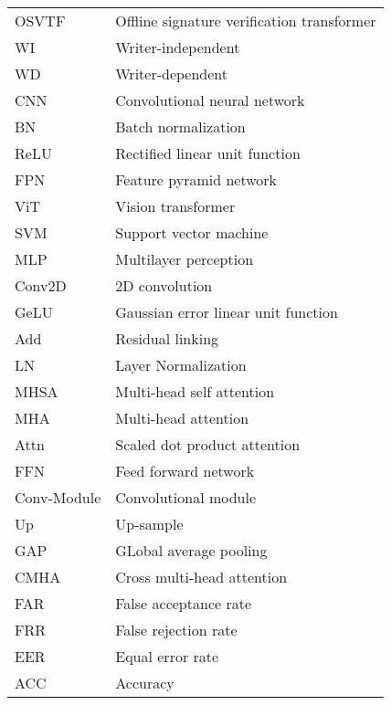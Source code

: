 \begin{tabular}{@{} l @{\hspace{3em}} l @{}}
    OSVTF & Offline signature verification transformer \\
    WI & Writer-independent \\
    WD & Writer-dependent \\
    CNN & Convolutional neural network \\
    BN & Batch normalization \\
    ReLU & Rectified linear unit function \\
    FPN & Feature pyramid network \\
    ViT & Vision transformer \\
    SVM & Support vector machine \\
    MLP & Multilayer perception \\
    Conv2D & 2D convolution \\
    GeLU & Gaussian error linear unit function \\
    Add & Residual linking \\
    LN & Layer Normalization \\
    MHSA & Multi-head self attention \\
    MHA & Multi-head attention \\
    Attn & Scaled dot product attention \\
    FFN & Feed forward network \\
    Conv-Module & Convolutional module \\
    Up & Up-sample \\
    GAP & GLobal average pooling \\
    CMHA & Cross multi-head attention \\
    FAR & False acceptance rate \\
    FRR & False rejection rate \\
    EER & Equal error rate \\
    ACC & Accuracy \\
\end{tabular}

